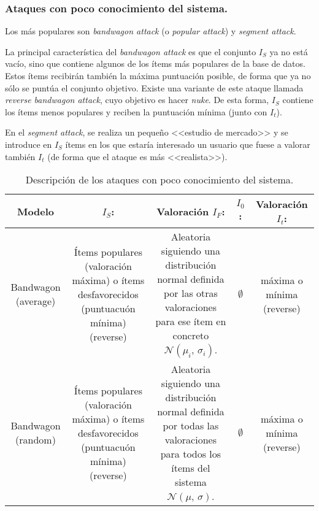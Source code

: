 \subsubsection{Ataques con poco conocimiento del sistema.}

Los más populares son \textit{bandwagon attack} (o \textit{popular attack}) y \textit{segment attack}.

La principal característica del \textit{bandwagon attack} es que el conjunto $I_S$ ya no está vacío, sino que contiene algunos de los ítems más populares de la base de datos. Estos ítems recibirán también la máxima puntuación posible, de forma que ya no sólo se puntúa el conjunto objetivo. Existe una variante de este ataque llamada \textit{reverse bandwagon attack}, cuyo objetivo es hacer \textit{nuke}. De esta forma, $I_S$ contiene los ítems menos populares y reciben la puntuación mínima (junto con $I_t$).

En el \textit{segment attack}, se realiza un pequeño <<estudio de mercado>> y se introduce en $I_S$ ítems en los que estaría interesado un usuario que fuese a valorar también $I_t$ (de forma que el ataque es más <<realista>>).

\begin{table}
	\centering
	\resizebox{15cm}{!} {
		\begin{tabular}{|c c c c c|}
			\hline
			
			Modelo & \textbf{$I_S$:} & Valoración \textbf{$I_F$:} & \textbf{$I_0$:} & Valoración \textbf{$I_t$:} \\\hline \hline
			
			Bandwagon (average) & \parbox{7em} {Ítems populares (valoración máxima) o ítems desfavorecidos (puntuacuón mínima) (reverse)} & \parbox{10em}{Aleatoria siguiendo una distribución normal definida por las otras valoraciones para ese ítem en concreto $\mathcal{N}(\mu_i,\,\sigma_i)$.} & $\emptyset$ & \parbox{7em}{máxima o mínima (reverse)} \\\hline
			
			Bandwagon (random) & \parbox{7em}{Ítems populares (valoración máxima) o ítems desfavorecidos (puntuacuón mínima) (reverse)} & \parbox{10em}{Aleatoria siguiendo una distribución normal definida por todas las valoraciones para todos los ítems del sistema $\mathcal{N}(\mu,\,\sigma)$.} & $\emptyset$ & \parbox{7em}{máxima o mínima (reverse)} \\\hline
		\end{tabular}
	}
	
	\caption{Descripción de los ataques con poco conocimiento del sistema.}
	\label{tabla_descripcion_ataques_poco_con}
\end{table}



